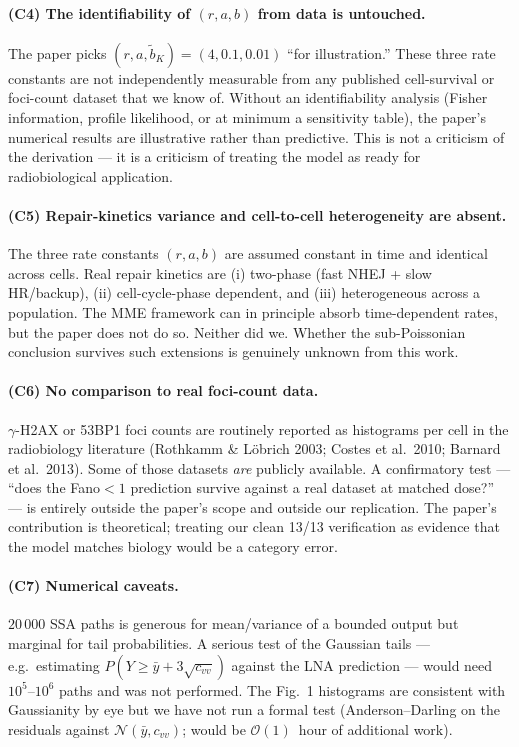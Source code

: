 \documentclass[11pt]{article}
\begin{document}
\paragraph{(C4) The identifiability of $(r,a,b)$ from data is untouched.}
The paper picks $(r,a,\tilde b_K)=(4,0.1,0.01)$ ``for illustration.''  These three rate constants are not independently measurable from any published cell-survival or foci-count dataset that we know of.  Without an identifiability analysis (Fisher information, profile likelihood, or at minimum a sensitivity table), the paper's numerical results are illustrative rather than predictive.  This is not a criticism of the derivation --- it is a criticism of treating the model as ready for radiobiological application.

\paragraph{(C5) Repair-kinetics variance and cell-to-cell heterogeneity are absent.}
The three rate constants $(r,a,b)$ are assumed constant in time and identical across cells.  Real repair kinetics are (i) two-phase (fast NHEJ + slow HR/backup), (ii) cell-cycle-phase dependent, and (iii) heterogeneous across a population.  The MME framework can in principle absorb time-dependent rates, but the paper does not do so.  Neither did we.  Whether the sub-Poissonian conclusion survives such extensions is genuinely unknown from this work.

\paragraph{(C6) No comparison to real foci-count data.}
$\gamma$-H2AX or 53BP1 foci counts are routinely reported as histograms per cell in the radiobiology literature (Rothkamm \& L\"obrich 2003; Costes et al.\ 2010; Barnard et al.\ 2013).  Some of those datasets \emph{are} publicly available.  A confirmatory test --- ``does the Fano$<1$ prediction survive against a real dataset at matched dose?'' --- is entirely outside the paper's scope and outside our replication.  The paper's contribution is theoretical; treating our clean 13/13 verification as evidence that the model matches biology would be a category error.

\paragraph{(C7) Numerical caveats.}
$20\,000$ SSA paths is generous for mean/variance of a bounded output but marginal for tail probabilities.  A serious test of the Gaussian tails --- e.g.\ estimating $P(Y\ge \bar y + 3\sqrt{c_{vv}})$ against the LNA prediction --- would need $10^5$--$10^6$ paths and was not performed.  The Fig.~1 histograms are consistent with Gaussianity by eye but we have not run a formal test (Anderson--Darling on the residuals against $\mathcal N(\bar y, c_{vv})$; would be $\mathcal O(1)$~hour of additional work).
\end{document}
